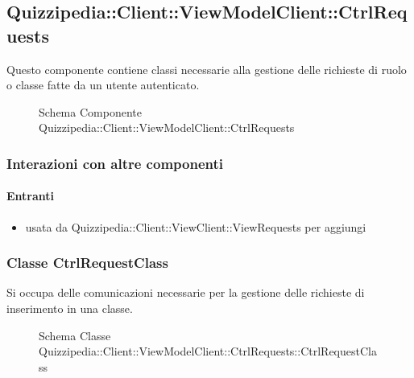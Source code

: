 \subsection{Quizzipedia::Client::ViewModelClient::CtrlRequests}
Questo componente contiene classi necessarie alla gestione delle richieste di ruolo o classe fatte da un utente autenticato.
\begin{figure}[H]
\centering
\noindent{}
\caption[Schema Componente Quizzipedia::Client::ViewModelClient::CtrlRequests]{Schema Componente Quizzipedia::Client::ViewModelClient::CtrlRequests}
\end{figure}
\subsubsection{Interazioni con altre componenti}
\paragraph{Entranti}
\begin{itemize}
\item usata da Quizzipedia::Client::ViewClient::ViewRequests per aggiungi
\end{itemize}
\subsubsection{Classe CtrlRequestClass}
Si occupa delle comunicazioni necessarie per la gestione delle richieste di inserimento in una classe.
\begin{figure}[H]
\centering
\noindent{}
\caption[Schema Classe CtrlRequestClass]{Schema Classe Quizzipedia::Client::ViewModelClient::CtrlRequests::CtrlRequestClass}
\end{figure}

